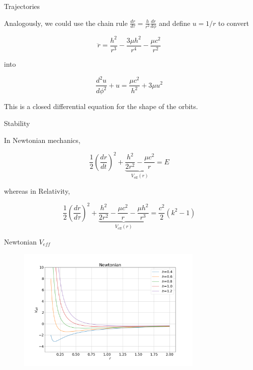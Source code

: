 \documentclass[xcolor=dvipsnames]{beamer}
\begin{document}
\begin{frame}{Trajectories}

Analogously, we could use the chain rule $\frac{dr}{d\tau} = \frac{h}{r^2} \frac{dr}{d\phi}$ and define $u = 1/r$ to convert 

\begin{equation*}
\ddot{r} = \frac{h^2}{r^3} - \frac{3\mu h^2}{r^4} - \frac{\mu c^2}{r^2}
\end{equation*}

into 

\begin{block}{}

\begin{equation*}
    \frac{d^2 u}{d\phi^2} + u = \frac{\mu c^2}{h^2} + 3 \mu u^2
\end{equation*}

\end{block}

This is a closed differential equation for the shape of the orbits.

\end{frame}




\begin{frame}{Stability}

In Newtonian mechanics, 
    
\begin{equation*}
    \frac12 \left( \frac{dr}{dt} \right)^2 + \underbrace{\frac{h^2}{2r^2} - \frac{\mu c^2}{r}}_{V_{\text{eff}}(r)} = E
\end{equation*}

whereas in Relativity,  

\begin{equation*}
    \frac12 \left( \frac{dr}{d\tau} \right)^2 + \underbrace{\frac{h^2}{2r^2} - \frac{\mu c^2}{r} - \frac{\mu h^2}{r^3}}_{V_{\text{eff}}(r)} = \frac{c^2}{2}(k^2-1)
\end{equation*}

\end{frame}



\begin{frame}{Newtonian $V_{eff}$}
    
    \begin{figure}[h!]
        \centering
        \includegraphics[width=0.8\textwidth]{Presentations/Images/2_veff_newton.png}
    \end{figure}
    
\end{frame}
\end{document}
